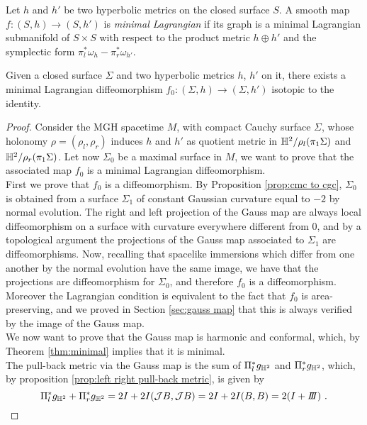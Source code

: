 \begin{definition}
    Let $h$ and $h'$ be two hyperbolic metrics on the closed surface $S$. A smooth map $f: (S,h) \to (S,h')$ is \textit{minimal Lagrangian} if its graph is a minimal Lagrangian submanifold of $S\times S$ with respect to the product metric $h \oplus h'$ and the symplectic form $\pi_l^*\omega_h - \pi_r^* \omega_{h'}$. 
\end{definition}

\begin{theorem}\label{thm:existence}
    Given a closed surface $\Sigma$ and two hyperbolic metrics $h$, $h'$ on it, there exists a minimal Lagrangian diffeomorphism $f_0 : (\Sigma,h) \to (\Sigma,h')$ isotopic to the identity.
\end{theorem}
\begin{proof}
    Consider the MGH spacetime $M$, with compact Cauchy surface $\Sigma$, whose holonomy $\rho = (\rho_l, \rho_r)$ induces $h$ and $h'$ as quotient metric in $\mathbb{H}^2 / \rho_l(\pi_1 \Sigma)$ and $\mathbb{H}^2 / \rho_r(\pi_1 \Sigma)$. Let now $\Sigma_0$ be a maximal surface in $M$, we want to prove that the associated map $f_0$ is a minimal Lagrangian diffeomorphism.\\
    First we prove that $f_0$ is a diffeomorphism. By Proposition \ref{prop:cmc to cgc}, $\Sigma_0$ is obtained from a surface $\Sigma_1$ of constant Gaussian curvature equal to $-2$ by normal evolution. The right and left projection of the Gauss map are always local diffeomorphism on a surface with curvature everywhere different from $0$, and by a topological argument the projections of the Gauss map associated to $\Sigma_1$ are diffeomorphisms. Now, recalling that spacelike immersions which differ from one another by the normal evolution have the same image, we have that the projections are diffeomorphism for $\Sigma_0$, and therefore $f_0$ is a diffeomorphism. Moreover the Lagrangian condition is equivalent to the fact that $f_0$ is area-preserving, and we proved in Section \ref{sec:gauss map} that this is always verified by the image of the Gauss map.\\
    We now want to prove that the Gauss map is harmonic and conformal, which, by Theorem \ref{thm:minimal} implies that it is minimal.\\
    The pull-back metric via the Gauss map is the sum of $\Pi_l^*g_{\mathbb{H}^2}$ and $\Pi_r^*g_{\mathbb{H}^2}$, which, by proposition \ref{prop:left right pull-back metric}, is given by
    \[
       \Pi_l^*g_{\H^2} + \Pi_r^*g_{\H^2} = 2I + 2I(\mathcal{J}B,\mathcal{J}B) = 2I + 2I(B,B)= 2(I+ \III) \ .
\]
\end{proof}

